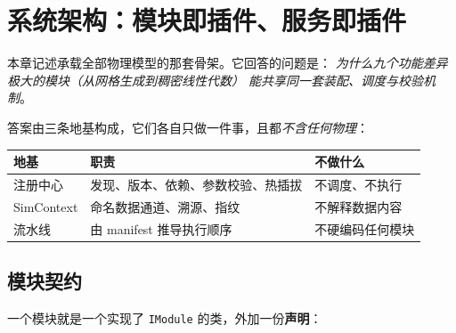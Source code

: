 
\chapter{系统架构：模块即插件、服务即插件}
\label{ch:architecture}

本章记述承载全部物理模型的那套骨架。它回答的问题是：
\emph{为什么九个功能差异极大的模块（从网格生成到稠密线性代数）
能共享同一套装配、调度与校验机制}。

答案由三条地基构成，它们各自只做一件事，且都\emph{不含任何物理}：

\begin{center}
\small
\begin{tabular}{@{}p{} p{} p{}@{}}
\toprule
\textbf{地基} & \textbf{职责} & \textbf{不做什么}\\
\midrule
注册中心 & 发现、版本、依赖、参数校验、热插拔 & 不调度、不执行\\
SimContext & 命名数据通道、溯源、指纹 & 不解释数据内容\\
流水线 & 由 manifest 推导执行顺序 & 不硬编码任何模块\\
\bottomrule
\end{tabular}
\end{center}

\section{模块契约}
\label{sec:arch-contract}

一个模块就是一个实现了 \texttt{IModule} 的类，外加一份\textbf{声明}：

